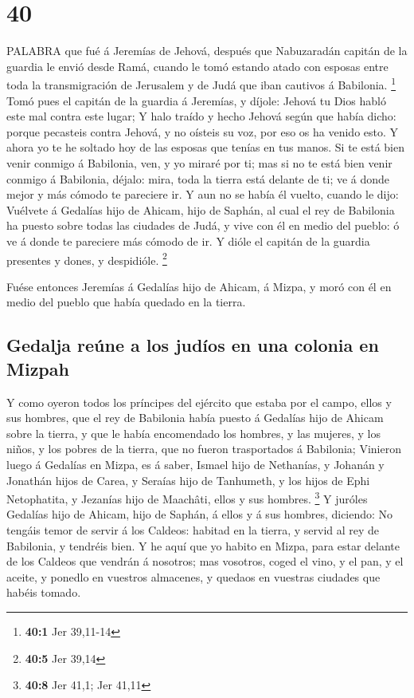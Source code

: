 \hypertarget{section-39}{%
\section{40}\label{section-39}}

 PALABRA que fué á Jeremías de Jehová, después que
Nabuzaradán capitán de la guardia le envió desde Ramá, cuando le tomó
estando atado con esposas entre toda la transmigración de Jerusalem y de
Judá que iban cautivos á Babilonia. \footnote{\textbf{40:1} Jer 39,11-14}
 Tomó pues el capitán de la guardia á Jeremías, y díjole:
Jehová tu Dios habló este mal contra este lugar;  Y halo
traído y hecho Jehová según que había dicho: porque pecasteis contra
Jehová, y no oísteis su voz, por eso os ha venido esto.  Y
ahora yo te he soltado hoy de las esposas que tenías en tus manos. Si te
está bien venir conmigo á Babilonia, ven, y yo miraré por ti; mas si no
te está bien venir conmigo á Babilonia, déjalo: mira, toda la tierra
está delante de ti; ve á donde mejor y más cómodo te pareciere ir.
 Y aun no se había él vuelto, cuando le dijo: Vuélvete á
Gedalías hijo de Ahicam, hijo de Saphán, al cual el rey de Babilonia ha
puesto sobre todas las ciudades de Judá, y vive con él en medio del
pueblo: ó ve á donde te pareciere más cómodo de ir. Y dióle el capitán
de la guardia presentes y dones, y despidióle. \footnote{\textbf{40:5}
  Jer 39,14}

 Fuése entonces Jeremías á Gedalías hijo de Ahicam, á Mizpa,
y moró con él en medio del pueblo que había quedado en la tierra.

\hypertarget{gedalja-reuxfane-a-los-juduxedos-en-una-colonia-en-mizpah}{%
\subsection{Gedalja reúne a los judíos en una colonia en
Mizpah}\label{gedalja-reuxfane-a-los-juduxedos-en-una-colonia-en-mizpah}}

 Y como oyeron todos los príncipes del ejército que estaba
por el campo, ellos y sus hombres, que el rey de Babilonia había puesto
á Gedalías hijo de Ahicam sobre la tierra, y que le había encomendado
los hombres, y las mujeres, y los niños, y los pobres de la tierra, que
no fueron trasportados á Babilonia;  Vinieron luego á
Gedalías en Mizpa, es á saber, Ismael hijo de Nethanías, y Johanán y
Jonathán hijos de Carea, y Seraías hijo de Tanhumeth, y los hijos de
Ephi Netophatita, y Jezanías hijo de Maachâti, ellos y sus hombres.
\footnote{\textbf{40:8} Jer 41,1; Jer 41,11}  Y juróles
Gedalías hijo de Ahicam, hijo de Saphán, á ellos y á sus hombres,
diciendo: No tengáis temor de servir á los Caldeos: habitad en la
tierra, y servid al rey de Babilonia, y tendréis bien.  Y
he aquí que yo habito en Mizpa, para estar delante de los Caldeos que
vendrán á nosotros; mas vosotros, coged el vino, y el pan, y el aceite,
y ponedlo en vuestros almacenes, y quedaos en vuestras ciudades que
habéis tomado.

